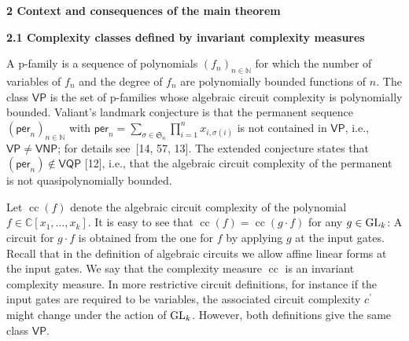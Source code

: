 

\par\medskip\noindent\textbf{2 Context and consequences of the main theorem}\par




\par\medskip\noindent\textbf{2.1 Complexity classes defined by invariant complexity measures}\par




A p-family is a sequence of polynomials $(f_{n})_{n\in\mathbb{N}}$ for which the number of variables of $f_{n}$ and the degree of $f_{n}$ are polynomially bounded functions of $n$. The class $\mathsf{VP}$ is the set of p-families whose algebraic circuit complexity is polynomially bounded.
Valiant’s landmark conjecture is that the permanent sequence $(\mathsf{per}_{n})_{n\in\mathbb{N}}$ with $\mathsf{per}_{n}=\sum_{\sigma\in\mathfrak{S}_{n}}\prod_{i=1}^{n}x_{i,\sigma(i)}$ is not contained in $\mathsf{VP}$, i.e., $\mathsf{VP}\neq\mathsf{VNP}$; for details see [14, 57, 13]. The extended conjecture states that $(\mathsf{per}_{n})\notin\mathsf{VQP}$ [12], i.e., that the algebraic circuit complexity of the permanent is not quasipolynomially bounded.





Let $\operatorname{cc}(f)$ denote the algebraic circuit complexity of the polynomial $f\in\mathbb{C}[x_{1},\ldots,x_{k}]$. It is easy to see that $\operatorname{cc}(f)=\operatorname{cc}(g\cdot f)$ for any $g\in\textnormal{GL}_{k}$: A circuit for $g\cdot f$ is obtained from the one for $f$ by applying $g$ at the input gates. Recall that in the definition of algebraic circuits we allow affine linear forms at the input gates. We say that the complexity measure $\operatorname{cc}$ is an invariant complexity measure.
In more restrictive circuit definitions, for instance if the input gates are required to be variables, the associated circuit complexity $c^{\prime}$ might change under the action of $\textnormal{GL}_{k}$. However, both definitions give the same class $\mathsf{VP}$.





